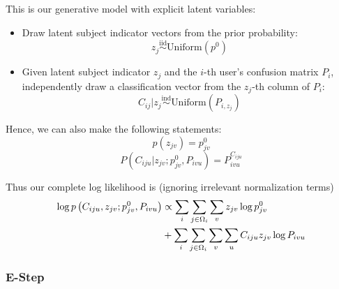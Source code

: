 \documentclass[useAMS,usenatbib,a4paper]{mn2e}
\def\indic#1{\mathbb{I}\left({#1}\right)}
\begin{document}
This is our generative model with explicit latent variables:
\begin{itemize}
  \item{Draw latent subject indicator vectors from the prior probability: $$z_{j}
    \overset{\text{iid}}{\sim} \text{Uniform}\left(p^0\right)$$}
  \item{Given latent subject indicator $z_{j}$ and the $i$-th user's confusion
    matrix $P_i$, independently draw a classification vector from the $z_j$-th column
  of $P_i$: $$C_{ij} | z_{j} \overset{\text{ind}}{\sim}
\text{Uniform}\left(P_{i,z_j}\right)$$}
\end{itemize}
Hence, we can also make the following statements:
\begin{equation}
  p(z_{jv}) = p^0_{jv}
\end{equation}
\begin{equation}
  \label{eq:PCiju}
  P(C_{iju} | z_{jv}; p^0_{jv}, P_{ivu}) = P_{ivu}^{C_{iju}}
\end{equation}

Thus our complete log likelihood is (ignoring irrelevant normalization terms)
\begin{align}
  \log p \left( C_{iju}, z_{jv}; p_{jv}^0, P_{ivu} \right) &\propto \sum_{i} \sum_{j \in
\Omega_i} \sum_{v} z_{jv} \log p_{jv}^0
  \notag\\
  &+ \sum_{i} \sum_{j \in \Omega_i} \sum_{v} \sum_{u} C_{iju} z_{jv} \log P_{ivu}
\end{align}

\subsubsection{E-Step}
\end{document}
